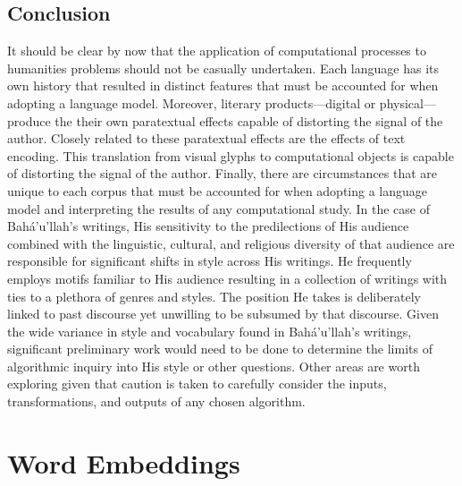 \documentclass[12pt, oneside]{report}
\begin{document}
\section{Conclusion}
It should be clear by now that the application of computational processes to humanities problems should not be casually undertaken.
Each language has its own history that resulted in distinct features that must be accounted for when adopting a language model.
Moreover, literary products---digital or physical---produce the their own paratextual effects capable of distorting the signal of the author.
Closely related to these paratextual effects are the effects of text encoding.
This translation from visual glyphs to computational objects is capable of distorting the signal of the author.
Finally, there are circumstances that are unique to each corpus that must be accounted for when adopting a language model and interpreting the results of any computational study.
In the case of Bah\'{a}'u'llah's writings, His sensitivity to the predilections of His audience combined with the linguistic, cultural, and religious diversity of that audience are responsible for significant shifts in style across His writings.
He frequently employs motifs familiar to His audience resulting in a collection of writings with ties to a plethora of genres and styles.
The position He takes is deliberately linked to past discourse yet unwilling to be subsumed by that discourse.
Given the wide variance in style and vocabulary found in Bah\'{a}'u'llah's writings, significant preliminary work would need to be done to determine the limits of algorithmic inquiry into His style or other questions.
Other areas are worth exploring given that caution is taken to carefully consider the inputs, transformations, and outputs of any chosen algorithm.
\chapter{Word Embeddings}
\end{document}
